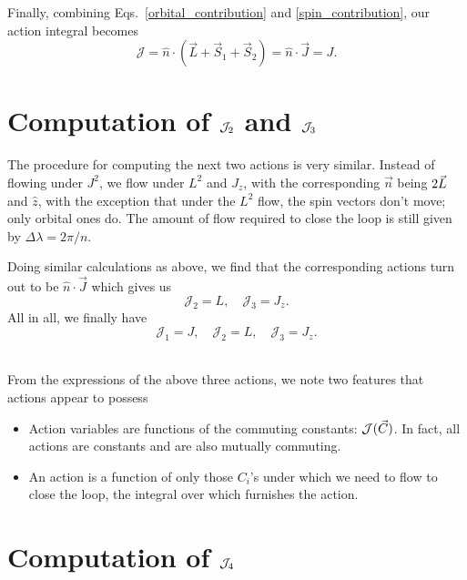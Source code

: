 Finally, combining Eqs.~\eqref{orbital_contribution} and \eqref{spin_contribution},
our action integral becomes 
\begin{equation}
\mathcal{J}=\hat{n} \cdot\left(\vec{L}+\vec{S}_{1}+\vec{S}_{2}\right)=\hat{n} \cdot \vec{J} = J.
\end{equation}




\section{Computation of $\mathcal{J}_2$ and $\mathcal{J}_3$}

The procedure for computing the next two actions is very similar.
Instead of flowing under $J^2$, we flow under $L^2$ and $J_z$,
with the corresponding $\vec{n}$ being $2 \vec{L}$ and $\hat{z}$,
with the exception that under the $L^2$ flow, the spin vectors
don't move; only orbital ones do.
The amount of flow required to close the loop is still given by
$\Delta \lambda = 2 \pi/n$.


Doing similar calculations as above, we find that the 
corresponding actions turn out to be $\hat{n} \cdot \vec{J}$
which gives us 
\begin{equation}
\mathcal{J}_{2}= L , \quad \mathcal{J}_{3}=  J_z.
\end{equation}
All in all, we finally have 
\begin{equation}
\mathcal{J}_{1}= J, \quad\mathcal{J}_{2}= L , \quad \mathcal{J}_{3}=  J_z.
\end{equation} \\



\begin{tcolorbox}
From the expressions of the above three actions, we note two features
that actions appear to possess
\begin{itemize}
\item Action variables are functions of the commuting constants: $\mathcal{J}(\vec{C})$.
In fact, all actions are constants and are also mutually commuting. 
\item An action is a function of only those $C_i$'s under which we need to flow
to close the loop, the integral over which furnishes the action. 
\end{itemize}
\end{tcolorbox}





\section{Computation of $\mathcal{J}_4$}


